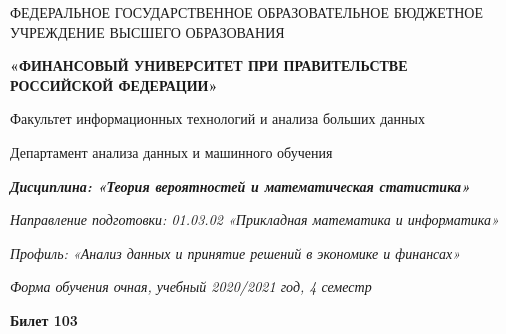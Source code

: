 \documentclass[a4paper,12pt]{article}
\begin{document}
\begin{center}
ФЕДЕРАЛЬНОЕ ГОСУДАРСТВЕННОЕ ОБРАЗОВАТЕЛЬНОЕ БЮДЖЕТНОЕ УЧРЕЖДЕНИЕ ВЫСШЕГО ОБРАЗОВАНИЯ

    \textbf{«ФИНАНСОВЫЙ УНИВЕРСИТЕТ ПРИ ПРАВИТЕЛЬСТВЕ РОССИЙСКОЙ ФЕДЕРАЦИИ»}

Факультет информационных технологий и анализа больших данных

Департамент анализа данных и машинного обучения

\textit{
	\textbf{Дисциплина: «Теория вероятностей и математическая статистика»}}

\textit{Направление подготовки: 01.03.02 «Прикладная математика и информатика»}

\textit{Профиль: «Анализ данных и принятие решений в экономике и финансах»}

\textit{Форма обучения очная, учебный 2020/2021 год, 4 семестр}

\textbf{Билет 103}

\end{center}
\end{document}
